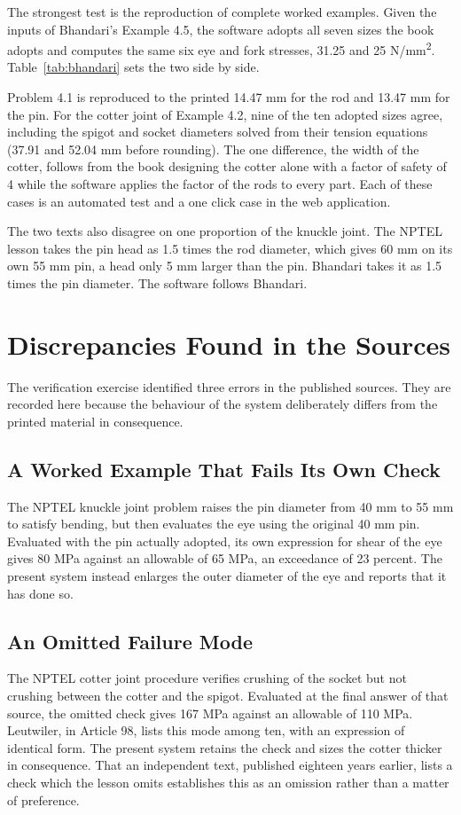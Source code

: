 The strongest test is the reproduction of complete worked examples. Given the inputs of Bhandari's Example 4.5, the software adopts all seven sizes the book adopts and computes the same six eye and fork stresses, 31.25 and 25 N/mm\textsuperscript{2}. Table~\ref{tab:bhandari} sets the two side by side.



Problem 4.1 is reproduced to the printed 14.47 mm for the rod and 13.47 mm for the pin. For the cotter joint of Example 4.2, nine of the ten adopted sizes agree, including the spigot and socket diameters solved from their tension equations (37.91 and 52.04 mm before rounding). The one difference, the width of the cotter, follows from the book designing the cotter alone with a factor of safety of 4 while the software applies the factor of the rods to every part. Each of these cases is an automated test and a one click case in the web application.

The two texts also disagree on one proportion of the knuckle joint. The NPTEL lesson takes the pin head as 1.5 times the rod diameter, which gives 60 mm on its own 55 mm pin, a head only 5 mm larger than the pin. Bhandari takes it as 1.5 times the pin diameter. The software follows Bhandari.

\section{Discrepancies Found in the Sources}
The verification exercise identified three errors in the published sources. They are recorded here because the behaviour of the system deliberately differs from the printed material in consequence.

\subsection{A Worked Example That Fails Its Own Check}
The NPTEL knuckle joint problem raises the pin diameter from 40 mm to 55 mm to satisfy bending, but then evaluates the eye using the original 40 mm pin. Evaluated with the pin actually adopted, its own expression for shear of the eye gives 80 MPa against an allowable of 65 MPa, an exceedance of 23 percent. The present system instead enlarges the outer diameter of the eye and reports that it has done so.

\subsection{An Omitted Failure Mode}
The NPTEL cotter joint procedure verifies crushing of the socket but not crushing between the cotter and the spigot. Evaluated at the final answer of that source, the omitted check gives 167 MPa against an allowable of 110 MPa. Leutwiler, in Article 98, lists this mode among ten, with an expression of identical form. The present system retains the check and sizes the cotter thicker in consequence. That an independent text, published eighteen years earlier, lists a check which the lesson omits establishes this as an omission rather than a matter of preference.

